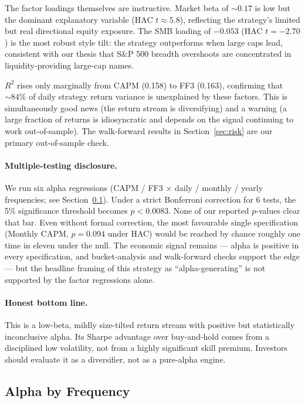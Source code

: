 \documentclass[11pt]{article}
\begin{document}
The factor loadings themselves are instructive. Market beta of $\sim 0.17$
is low but the dominant explanatory variable (HAC $t \approx 5.8$),
reflecting the strategy's limited but real directional equity exposure.
The SMB loading of $-0.053$ (HAC $t = -2.70$) is the most robust style
tilt: the strategy outperforms when large caps lead, consistent with our
thesis that S\&P 500 breadth overshoots are concentrated in
liquidity-providing large-cap names.

$R^2$ rises only marginally from CAPM (0.158) to FF3 (0.163), confirming
that $\sim 84\%$ of daily strategy return variance is unexplained by these
factors. This is simultaneously good news (the return stream is
diversifying) and a warning (a large fraction of returns is idiosyncratic
and depends on the signal continuing to work out-of-sample). The
walk-forward results in Section~\ref{sec:risk} are our primary
out-of-sample check.

\paragraph{Multiple-testing disclosure.} We run six alpha regressions
(CAPM / FF3 $\times$ daily / monthly / yearly frequencies; see
Section~\ref{sec:alpha-freq}). Under a strict Bonferroni correction for 6
tests, the 5\% significance threshold becomes $p < 0.0083$. None of our
reported $p$-values clear that bar. Even without formal correction, the
most favourable single specification (Monthly CAPM, $p = 0.094$ under HAC)
would be reached by chance roughly one time in eleven under the null. The
economic signal remains --- alpha is positive in every specification, and
bucket-analysis and walk-forward checks support the edge --- but the
headline framing of this strategy as ``alpha-generating'' is not supported
by the factor regressions alone.

\paragraph{Honest bottom line.} This is a low-beta, mildly size-tilted
return stream with positive but statistically inconclusive alpha. Its
Sharpe advantage over buy-and-hold comes from a disciplined low
volatility, not from a highly significant skill premium. Investors should
evaluate it as a diversifier, not as a pure-alpha engine.
\newpage
\subsection{Alpha by Frequency}
\label{sec:alpha-freq}
\end{document}
